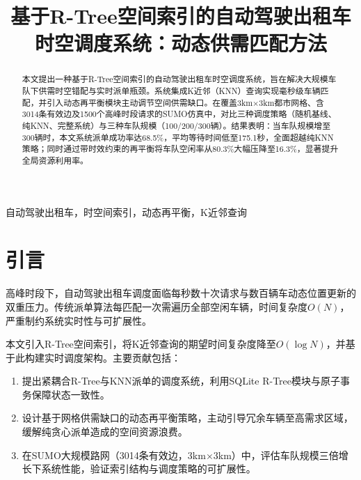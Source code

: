 \documentclass[conference]{IEEEtran}
\begin{document}
\title{基于R-Tree空间索引的自动驾驶出租车时空调度系统：动态供需匹配方法}

\author{
}

\maketitle

\begin{abstract}
本文提出一种基于R-Tree空间索引的自动驾驶出租车时空调度系统，旨在解决大规模车队下供需时空错配与实时派单瓶颈。系统集成K近邻（KNN）查询实现毫秒级车辆匹配，并引入动态再平衡模块主动调节空间供需缺口。在覆盖3km$\times$3km都市网格、含3014条有效边及1500个高峰时段请求的SUMO仿真中，对比三种调度策略（随机基线、纯KNN、完整系统）与三种车队规模（100/200/300辆）。结果表明：当车队规模增至300辆时，本文系统派单成功率达68.5\%，平均等待时间低至175.1秒，全面超越纯KNN策略；同时通过带时效约束的再平衡将车队空闲率从80.3\%大幅压降至16.3\%，显著提升全局资源利用率。
\end{abstract}

\begin{IEEEkeywords}
自动驾驶出租车，时空间索引，动态再平衡，K近邻查询
\end{IEEEkeywords}

\section{引言}
高峰时段下，自动驾驶出租车调度面临每秒数十次请求与数百辆车动态位置更新的双重压力。传统派单算法每匹配一次需遍历全部空闲车辆，时间复杂度\(O(N)\)，严重制约系统实时性与可扩展性。

本文引入R-Tree空间索引，将K近邻查询的期望时间复杂度降至\(O(\log N)\)，并基于此构建实时调度架构。主要贡献包括：
\begin{enumerate}
    \item 提出紧耦合R-Tree与KNN派单的调度系统，利用SQLite R-Tree模块与原子事务保障状态一致性。
    \item 设计基于网格供需缺口的动态再平衡策略，主动引导冗余车辆至高需求区域，缓解纯贪心派单造成的空间资源浪费。
    \item 在SUMO大规模路网（3014条有效边，3km\(\times\)3km）中，评估车队规模三倍增长下系统性能，验证索引结构与调度策略的可扩展性。
\end{enumerate}
\end{document}
